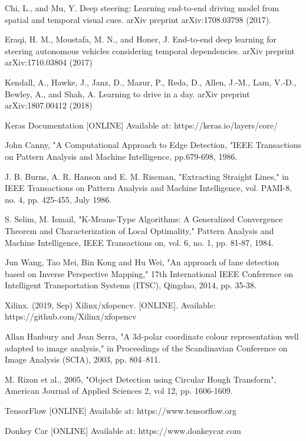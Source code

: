 \documentclass[conference]{IEEEtran}
\begin{document}
\begin{sloppypar}
\begin{thebibliography}{00}
 Chi, L., and Mu, Y. Deep steering: Learning end-to-end driving model from spatial and temporal visual cues. arXiv preprint arXiv:1708.03798 (2017).

 Eraqi, H. M., Moustafa, M. N., and Honer, J. End-to-end deep learning for steering autonomous vehicles considering temporal dependencies. arXiv preprint arXiv:1710.03804 (2017)

 Kendall, A., Hawke, J., Janz, D., Mazur, P., Reda, D., Allen, J.-M., Lam, V.-D., Bewley, A., and Shah, A. Learning to drive in a day. arXiv preprint arXiv:1807.00412 (2018)

 Keras Documentation [ONLINE] Available at: https://keras.io/layers/core/

 John Canny, "A Computational Approach to Edge Detection, "IEEE Transactions on Pattern Analysis and Machine Intelligence, pp.679-698, 1986.

 J. B. Burns, A. R. Hanson and E. M. Riseman, "Extracting Straight Lines," in IEEE Transactions on Pattern Analysis and Machine Intelligence, vol. PAMI-8, no. 4, pp. 425-455, July 1986.

 S. Selim, M. Ismail, "K-Means-Type Algorithms: A Generalized Convergence Theorem and Characterization of Local Optimality," Pattern Analysis and Machine Intelligence, IEEE Transactions on, vol. 6, no. 1, pp. 81-87, 1984. 

 Jun Wang, Tao Mei, Bin Kong and Hu Wei, "An approach of lane detection based on Inverse Perspective Mapping," 17th International IEEE Conference on Intelligent Transportation Systems (ITSC), Qingdao, 2014, pp. 35-38.

 Xilinx. (2019, Sep) Xilinx/xfopencv. [ONLINE]. Available:  https://github.com/Xilinx/xfopencv

 Allan Hanbury and Jean Serra, "A 3d-polar coordinate colour representation well adapted to image analysis," in Proceedings of the Scandinavian Conference on Image Analysis (SCIA), 2003, pp. 804–811.

 M. Rizon et al., 2005, "Object Detection using Circular Hough Transform", American Journal of Applied Sciences 2, vol 12, pp. 1606-1609.

 TensorFlow [ONLINE] Available at: https://www.tensorflow.org

 Donkey Car [ONLINE] Available at: https://www.donkeycar.com


\end{thebibliography}
\end{sloppypar}
\end{document}
